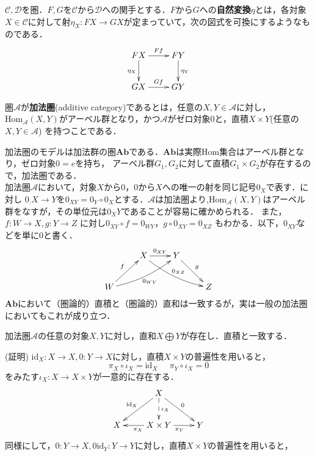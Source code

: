 
\begin{defi}
$\mathcal{C},\mathcal{D}$を圏．$F,G$を$\mathcal{C}$から$\mathcal{D}$への関手とする．$F$から$G$への{\bf 自然変換}$\eta$とは，各対象$X \in \mathcal{C}$に対して射$\eta_X : FX \to GX $が定まっていて，次の図式を可換にするようなものである．
\[ 
\xymatrix {
	FX	\ar[r]^{Ff} \ar[d]_{\eta_X}	& FY \ar[d]^{\eta_Y} \\
	GX	\ar[r]^{Gf} 				& GY
}
\]
\end{defi} \proofend

\begin{defi}
圏$\mathcal{A}$が{\bf 加法圏}(additive category)であるとは，任意の$X,Y \in \mathcal{A}$に対し，$\mathrm{Hom}_\mathcal{A}(X,Y)$がアーベル群となり，かつ$\mathcal{A}$がゼロ対象$0$と，直積$X \times Y$(任意の$X,Y \in \mathcal{A}$) を持つことである．
\end{defi} \proofend
加法圏のモデルは加法群の圏$\mathbf{Ab}$である．$\mathbf{Ab}$は実際Hom集合はアーベル群となり，ゼロ対象$0 = {e}$を持ち，
アーベル群$G_1,G_2$に対して直積$G_1 \times G_2 $が存在するので，加法圏である．\\
加法圏$\mathcal{A}$において，対象$X$から$0$，$0$から$X$への唯一の射を同じ記号$0_X$で表す．に対し
$0_ : X \to Y$を$0_{XY} = 0_Y \circ 0_X$とする．$\mathcal{A}$は加法圏より,$\mathrm{Hom}_\mathcal{A}(X,Y)$はアーベル群をなすが，その単位元は$0_XY$であることが容易に確かめられる． また，$f:W \to X , g:Y\to Z$ に対し$0_{XY} \circ f = 0_{WY} ，
g \circ 0_{XY} = 0_{XZ}$ もわかる．以下，$0_{XY}$などを単に0と書く．
\[
\xymatrix{
&	X \ar[r]^{0_{XY}} \ar@/_/[rrd]^{0_{XZ}}& Y \ar[dr]^{g} \\
W  \ar[ur]^f \ar@/_/[urr]_{0_{WY}}&&&Z
}
\]
$\mathbf{Ab}$において（圏論的）直積と（圏論的）直和は一致するが，実は一般の加法圏においてもこれが成り立つ．
\begin{prop}
加法圏$\mathcal{A}$の任意の対象$X,Y$に対し，直和$X \bigoplus Y$が存在し．直積と一致する．
\end{prop}
(証明)
$\mathrm{id}_X : X \to X, 0 :Y \to X$に対し，直積$X \times Y$の普遍性を用いると，
\[
\pi_X \circ \iota_X = \mathrm{id}_X\;\;\;\;\;\pi_Y \circ \iota_X = 0
\]
をみたす$\iota_X : X \to X\times Y$が一意的に存在する．
\[
\xymatrix{
	& \ar[dl]_{\mathrm{id}_X} X  \ar@{-->}[d]^{\iota_X}  \ar[dr]^{0}	& \\
X 	& \ar[l]^{\pi_X} X \times Y \ar[r]_{\pi_Y} 	& Y 
}
\]
同様にして，$0: Y \to X, 0 \mathrm{id}_Y:Y \to Y$に対し，直積$X \times Y$の普遍性を用いると，
